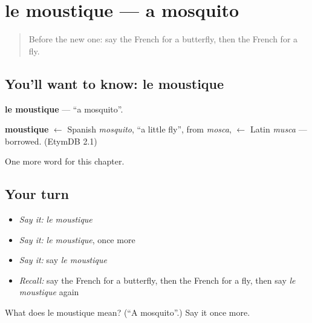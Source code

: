 \section[le moustique]{le moustique — a mosquito}

\label{lesson:FR-C194-moustique}



\begin{quote}
Before the new one: say the French for a butterfly, then the French for a fly.
\end{quote}

\subsection*{You'll want to know: le moustique}
\textbf{le moustique} — \textquotedblleft{}a mosquito\textquotedblright{}.

\begin{cousinweb}
\textbf{moustique} $\leftarrow$ Spanish \emph{mosquito}, \textquotedblleft{}a little fly\textquotedblright{}, from \emph{mosca}, $\leftarrow$ Latin \emph{musca} — borrowed. (EtymDB 2.1)
\end{cousinweb}

\begin{grammarlens}[title={What you've built}]
One more word for this chapter.
\end{grammarlens}

\subsection*{Your turn}
\begin{itemize}
\raggedright
  \item \emph{Say it:} \emph{le moustique}
  \item \emph{Say it:} \emph{le moustique}, once more
  \item \emph{Say it:} say \emph{le moustique}
  \item \emph{Recall:} say the French for a butterfly, then the French for a fly, then say \emph{le moustique} again
\end{itemize}

\begin{tcolorbox}[breakable,colback=teal!4,colframe=teal!35!black,title={Before you move on}]
What does le moustique mean? (\textquotedblleft{}A mosquito\textquotedblright{}.) Say it once more.
\end{tcolorbox}
